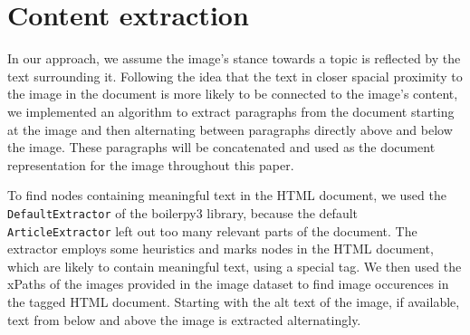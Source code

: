 \documentclass[
]{ceurart}
\begin{document}
\section{Content extraction} \label{content-extraction}

In our approach, we assume the image's stance towards a topic is reflected by the text surrounding it. Following the idea that the text in closer spacial proximity to the image in the document is more likely to be connected to the image's content, we implemented an algorithm to extract paragraphs from the document starting at the image and then alternating between paragraphs directly above and below the image. These paragraphs will be concatenated and used as the document representation for the image throughout this paper.

To find nodes containing meaningful text in the HTML document, we used the \texttt{DefaultExtractor} of the boilerpy3 library, because the default \texttt{ArticleExtractor} left out too many relevant parts of the document. The extractor employs some heuristics and marks nodes in the HTML document, which are likely to contain meaningful text, using a special tag. We then used the xPaths of the images provided in the image dataset to find image occurences in the tagged HTML document. Starting with the alt text of the image, if available, text from below and above the image is extracted alternatingly.
\end{document}

